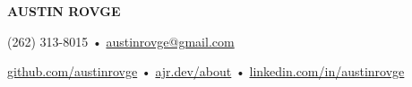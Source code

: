 \centering\textbf{\LARGE AUSTIN ROVGE}

\centering(262) 313-8015 • \href{mailto:austinrovge@gmail.com}{austinrovge@gmail.com}

\centering\href{https://github.com/austinrovge}{github.com/austinrovge} • \href{https://ajr.dev/about}{ajr.dev/about} • \href{https://linkedin.com/in/austinrovge}{linkedin.com/in/austinrovge}
